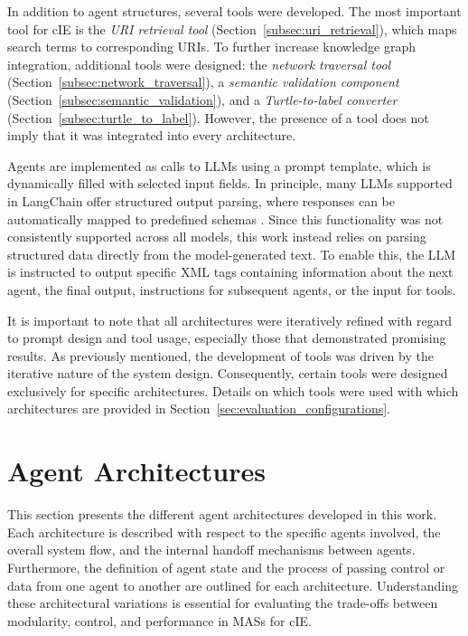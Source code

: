 \documentclass[a4paper,oneside,bibliography=totoc]{scrbook}
\begin{document}
In addition to agent structures, several tools were developed. The most important tool for \ac{cIE} is the \textit{URI retrieval tool} (Section~\ref{subsec:uri_retrieval}), which maps search terms to corresponding URIs. To further increase knowledge graph integration, additional tools were designed: the \textit{network traversal tool} (Section~\ref{subsec:network_traversal}), a \textit{semantic validation component} (Section~\ref{subsec:semantic_validation}), and a \textit{Turtle-to-label converter} (Section~\ref{subsec:turtle_to_label}). However, the presence of a tool does not imply that it was integrated into every architecture.

Agents are implemented as calls to \acp{LLM} using a prompt template, which is dynamically filled with selected input fields. In principle, many \acp{LLM} supported in LangChain offer structured output parsing, where responses can be automatically mapped to predefined schemas \cite{LangChain2025e}. Since this functionality was not consistently supported across all models, this work instead relies on parsing structured data directly from the model-generated text. To enable this, the \ac{LLM} is instructed to output specific XML tags containing information about the next agent, the final output, instructions for subsequent agents, or the input for tools.

It is important to note that all architectures were iteratively refined with regard to prompt design and tool usage, especially those that demonstrated promising results. As previously mentioned, the development of tools was driven by the iterative nature of the system design. Consequently, certain tools were designed exclusively for specific architectures. Details on which tools were used with which architectures are provided in Section~\ref{sec:evaluation_configurations}.

\section{Agent Architectures}
\label{sec:agent_architectures}

This section presents the different agent architectures developed in this work. Each architecture is described with respect to the specific agents involved, the overall system flow, and the internal handoff mechanisms between agents. Furthermore, the definition of agent state and the process of passing control or data from one agent to another are outlined for each architecture. Understanding these architectural variations is essential for evaluating the trade-offs between modularity, control, and performance in \acp{MAS} for \ac{cIE}.
\end{document}
